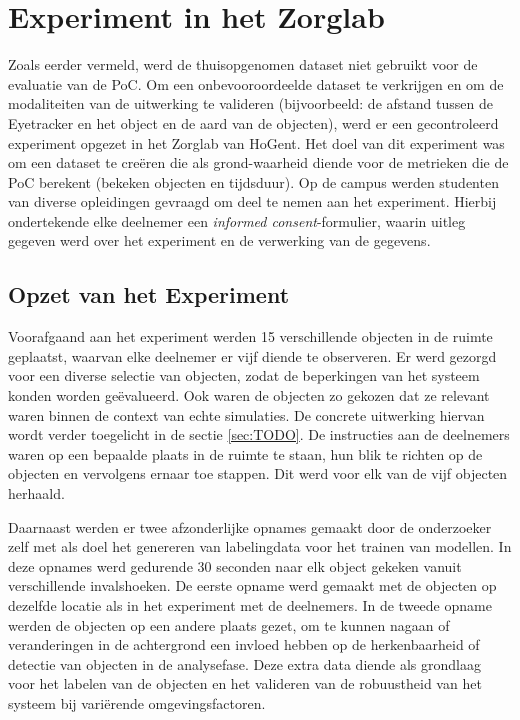\section{Experiment in het Zorglab}

Zoals eerder vermeld, werd de thuisopgenomen dataset niet gebruikt voor de evaluatie van de PoC. 
Om een onbevooroordeelde dataset te verkrijgen en om de modaliteiten van de uitwerking te valideren (bijvoorbeeld: de afstand tussen de Eyetracker en het object en de aard van de objecten), werd er een gecontroleerd experiment opgezet in het Zorglab van HoGent.
Het doel van dit experiment was om een dataset te creëren die als grond-waarheid diende voor de metrieken die de PoC berekent (bekeken objecten en tijdsduur).
Op de campus werden studenten van diverse opleidingen gevraagd om deel te nemen aan het experiment.
Hierbij ondertekende elke deelnemer een \textit{informed consent}-formulier, waarin uitleg gegeven werd over het experiment en de verwerking van de gegevens.

\subsection{Opzet van het Experiment}

Voorafgaand aan het experiment werden 15 verschillende objecten in de ruimte geplaatst, waarvan elke deelnemer er vijf diende te observeren.
Er werd gezorgd voor een diverse selectie van objecten, zodat de beperkingen van het systeem konden worden geëvalueerd.
Ook waren de objecten zo gekozen dat ze relevant waren binnen de context van echte simulaties. De concrete uitwerking hiervan wordt verder toegelicht in de sectie \ref{sec:TODO}.
De instructies aan de deelnemers waren op een bepaalde plaats in de ruimte te staan, hun blik te richten op de objecten en vervolgens ernaar toe stappen.
Dit werd voor elk van de vijf objecten herhaald.

Daarnaast werden er twee afzonderlijke opnames gemaakt door de onderzoeker zelf met als doel het genereren van labelingdata voor het trainen van modellen.
In deze opnames werd gedurende 30 seconden naar elk object gekeken vanuit verschillende invalshoeken.
De eerste opname werd gemaakt met de objecten op dezelfde locatie als in het experiment met de deelnemers.
In de tweede opname werden de objecten op een andere plaats gezet, om te kunnen nagaan of veranderingen in de achtergrond een invloed hebben op de herkenbaarheid of detectie van objecten in de analysefase.
Deze extra data diende als grondlaag voor het labelen van de objecten en het valideren van de robuustheid van het systeem bij variërende omgevingsfactoren.

